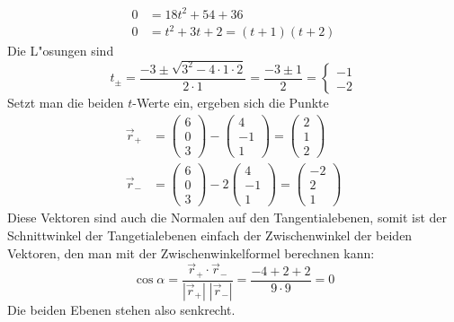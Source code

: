 \begin{loesung}
\begin{align*}
0&=18t^2+54+36
\\
0&=t^2+3t+2=(t+1)(t+2)
\end{align*}
Die L"osungen sind
\[
t_{\pm}=\frac{-3\pm\sqrt{3^2-4\cdot1\cdot 2}}{2\cdot 1}
=\frac{-3\pm1}{2}
=\begin{cases}
-1\\
-2
\end{cases}
\]
Setzt man die beiden $t$-Werte ein, ergeben sich die Punkte
\begin{align*}
\vec r_+&=
\begin{pmatrix}6\\0\\3\end{pmatrix}
-
\begin{pmatrix}4\\-1\\1\end{pmatrix}
=
\begin{pmatrix}2\\1\\2\end{pmatrix}
\\
\vec r_-&=
\begin{pmatrix}6\\0\\3\end{pmatrix}
-2
\begin{pmatrix}4\\-1\\1\end{pmatrix}
=
\begin{pmatrix}-2\\2\\1\end{pmatrix}
\end{align*}
Diese Vektoren sind auch die Normalen auf den Tangentialebenen,
somit ist der Schnittwinkel der Tangetialebenen einfach der
Zwischenwinkel der beiden Vektoren, den man mit der Zwischenwinkelformel
berechnen kann:
\[
\cos \alpha=
\frac{\vec r_+\cdot\vec r_-} {|\vec r_+|\;|\vec r_-|}
=\frac{-4+2+2}{9\cdot 9}=0
\]
Die beiden Ebenen stehen also senkrecht.
\end{loesung}

